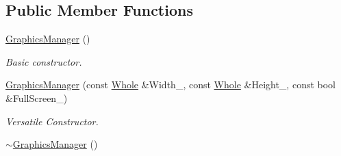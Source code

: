 \subsection*{Public Member Functions}
\begin{DoxyCompactItemize}
\item 
\hyperlink{classphys_1_1GraphicsManager_aceab258136ec2f29c8f163bf270f62c1}{GraphicsManager} ()
\begin{DoxyCompactList}\small\item\em Basic constructor. \item\end{DoxyCompactList}\item 
\hyperlink{classphys_1_1GraphicsManager_af9ac5e5f56e5eb2f94c16d594e70123b}{GraphicsManager} (const \hyperlink{namespacephys_a460f6bc24c8dd347b05e0366ae34f34a}{Whole} \&Width\_\-, const \hyperlink{namespacephys_a460f6bc24c8dd347b05e0366ae34f34a}{Whole} \&Height\_\-, const bool \&FullScreen\_\-)
\begin{DoxyCompactList}\small\item\em Versatile Constructor. \item\end{DoxyCompactList}\item 
\hypertarget{classphys_1_1GraphicsManager_a3a2cb4b7e078faa168025c835062e78f}{
\hyperlink{classphys_1_1GraphicsManager_a3a2cb4b7e078faa168025c835062e78f}{$\sim$GraphicsManager} ()}
\label{dd/d63/classphys_1_1GraphicsManager_a3a2cb4b7e078faa168025c835062e78f}


\end{DoxyCompactItemize}
